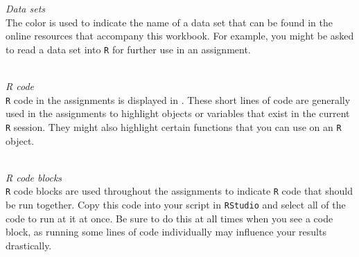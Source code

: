 \bigskip

\textit{Data sets} \\

The color  is used to indicate the name of a data set that can be found in the online resources that accompany this workbook. For example, you might be asked to read a data set into \texttt{R} for further use in an assignment. \\

 \\

\bigskip 

\textit{R code} \\ 

\texttt{R} code in the assignments is displayed in . These short lines of code are generally used in the assignments to highlight objects or variables that exist in the current \texttt{R} session. They might also highlight certain functions that you can use on an \texttt{R} object. \\

 \\ 

\bigskip

\textit{R code blocks} \\ 

\texttt{R} code blocks are used throughout the assignments to indicate \texttt{R} code that should be run together. Copy this code into your script in \texttt{RStudio} and select all of the code to run at it at once. Be sure to do this at all times when you see a code block, as running some lines of code individually may influence your results drastically. \\


